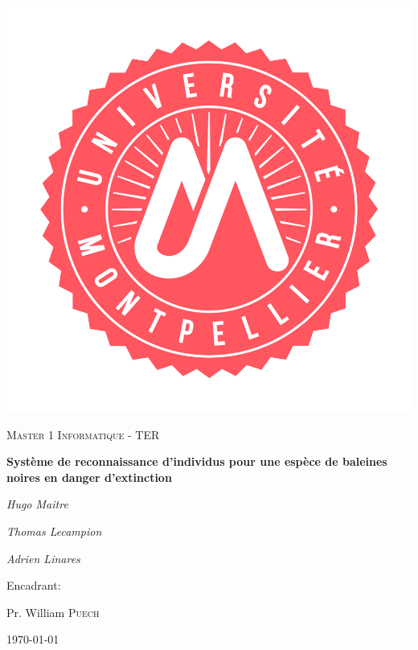 \documentclass[12pt,a4paper]{report}
\begin{document}
\begin{titlepage}
	\centering
	\includegraphics[scale=0.15]{figures/logotp.png}\par\vspace{2.5cm}
	{\scshape\Large Master 1 Informatique - TER\par}
	\vspace{1.5cm}
	{\huge\bfseries Système de reconnaissance d'individus pour une espèce de baleines noires en danger d'extinction \par}
	\vspace{1.5cm}
	{\Large\itshape Hugo Maitre \par}
	{\Large\itshape Thomas Lecampion \par}
	{\Large\itshape Adrien Linares \par}


\vspace{1em}

	\vfill
	Encadrant:\par
	Pr. William \textsc{Puech}\par
	\vfill
	
	\vspace{1em}
	
	{\large \today\par}
\end{titlepage}
\end{document}
